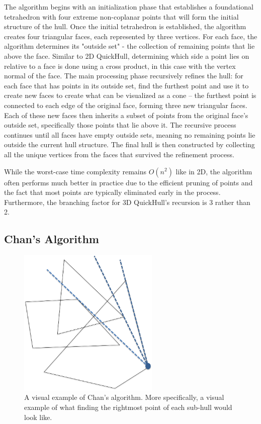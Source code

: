 \documentclass[12pt]{article}
\begin{document}
    The algorithm begins with an initialization phase that establishes a foundational tetrahedron with four extreme non-coplanar points that will form the initial structure of the hull. Once the initial tetrahedron is established, the algorithm creates four triangular faces, each represented by three vertices. For each face, the algorithm determines its "outside set" - the collection of remaining points that lie above the face. Similar to 2D QuickHull, determining which side a point lies on relative to a face is done using a cross product, in this case with the vertex normal of the face. The main processing phase recursively refines the hull: for each face that has points in its outside set, find the furthest point and use it to create new faces to create what can be visualized as a cone – the furthest point is connected to each edge of the original face, forming three new triangular faces. Each of these new faces then inherits a subset of points from the original face's outside set, specifically those points that lie above it. The recursive process continues until all faces have empty outside sets, meaning no remaining points lie outside the current hull structure. The final hull is then constructed by collecting all the unique vertices from the faces that survived the refinement process.

    While the worst-case time complexity remains $O(n^2)$ like in 2D, the algorithm often performs much better in practice due to the efficient pruning of points and the fact that most points are typically eliminated early in the process. Furthermore, the branching factor for 3D QuickHull’s recursion is 3 rather than 2.

  \newpage 
  \subsection*{Chan's Algorithm}

    \begin{figure}[h!]
      \centering
      \includegraphics[width=0.6\textwidth]{chans.png}
      \caption{A visual example of Chan's algorithm. More specifically, a visual example of what finding the rightmost point of each sub-hull would look like.}
    \end{figure}
    
\end{document}
